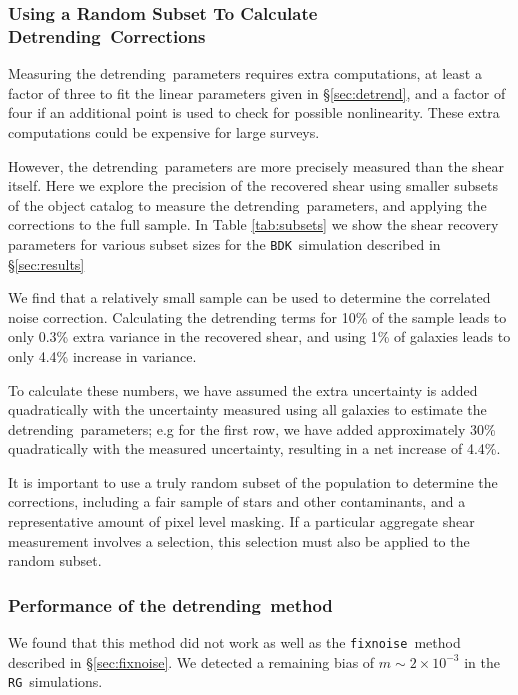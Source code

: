 \documentclass[iop, twocolappendix, appendixfloats, numberedappendix, apj]{emulateapj}
\newcommand{\detrend}{detrending}
\newcommand{\Detrend}{Detrending}
\newcommand{\fixnoise}{\texttt{fixnoise}}
\newcommand{\bdksim}{\texttt{BDK}}
\newcommand{\rgsim}{\texttt{RG}}
\begin{document}
\subsubsection{Using a Random Subset To Calculate \Detrend\ Corrections}

Measuring the \detrend\ parameters requires extra computations, at least a
factor of three to fit the linear parameters given in \S \ref{sec:detrend}, and
a factor of four if an additional point is used to check for possible
nonlinearity. These extra computations could be expensive for large surveys.  

However, the \detrend\ parameters are more precisely measured than the shear
itself.  Here we explore the precision of the recovered shear using smaller
subsets of the object catalog to measure the \detrend\ parameters, and
applying the corrections to the full sample.  In Table \ref{tab:subsets}
we show the shear recovery parameters for various subset sizes for the
\bdksim\ simulation described in \S \ref{sec:results}



We find that a relatively small sample can be used to determine the correlated
noise correction.  Calculating the detrending terms for 10\% of the sample
leads to only 0.3\% extra variance in the recovered shear, and using 1\% of
galaxies leads to only 4.4\% increase in variance.

To calculate these numbers, we have assumed the extra uncertainty is added
quadratically with the uncertainty measured using all galaxies to estimate the
\detrend\ parameters; e.g for the first row, we have added approximately 30\%
quadratically with the measured uncertainty, resulting in a net increase of
4.4\%.

It is important to use a truly random subset of the population to determine the
corrections, including a fair sample of stars and other contaminants, and a
representative amount of pixel level masking.  If a particular aggregate shear
measurement involves a selection, this selection must also be applied to the
random subset.

\subsubsection{Performance of the \detrend\ method}

We found that this method did not work as well as the \fixnoise\ method
described in \S \ref{sec:fixnoise}.  We detected a remaining bias of $m \sim 2
\times 10^{-3}$ in the \rgsim\ simulations.
\end{document}
